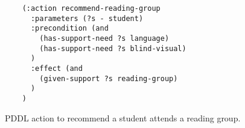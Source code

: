 \begin{figure}[t]
    \begin{lstlisting}
    (:action recommend-reading-group
      :parameters (?s - student)
      :precondition (and 
        (has-support-need ?s language)
        (has-support-need ?s blind-visual)
      )
      :effect (and 
        (given-support ?s reading-group)
      )
    )
    \end{lstlisting}
    \caption{PDDL action to recommend a student attends a reading group.}\label{fig:pddl-action-reading-group}
\end{figure}